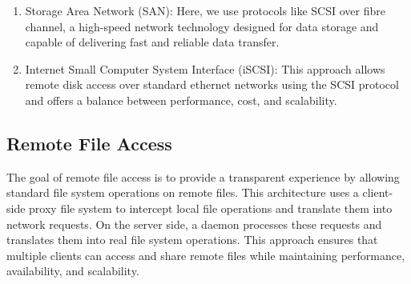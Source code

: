 \documentclass{report}
\begin{document}
\begin{enumerate}[label=\textit{(\roman*)}]
\item Storage Area Network (SAN): Here, we use protocols like SCSI over fibre channel, a high-speed
  network technology designed for data storage and capable of delivering fast and reliable data
  transfer.
\item Internet Small Computer System Interface (iSCSI): This approach allows remote disk access over
  standard ethernet networks using the SCSI protocol and  offers a balance between performance,
  cost, and scalability.
\end{enumerate}


\subsection{Remote File Access}
The goal of remote file access is to provide a transparent experience by allowing standard file
system operations on remote files. This architecture uses a client-side proxy file system to
intercept local file operations and translate them into network requests. On the server side, a
daemon processes these requests and translates them into real file system operations. This approach
ensures that multiple clients can access and share remote files while maintaining performance,
availability, and scalability.
\end{document}
